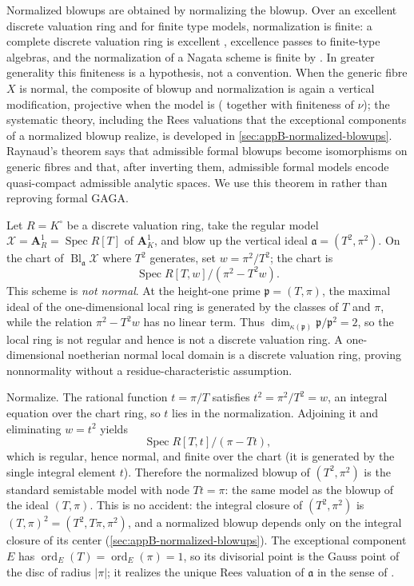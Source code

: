 Normalized blowups are obtained by normalizing the blowup.
Over an excellent
discrete valuation ring and for finite type models, normalization is finite:
a complete discrete valuation ring is excellent
\cite[Scholie~7.8.3]{EGAIV2}, excellence passes to finite-type algebras, and
the normalization of a Nagata scheme is finite by
\cite[Tag 035S]{stacks-project}.
In greater generality this finiteness is a hypothesis, not a convention.
When the generic fibre $X$ is normal, the composite of blowup and
normalization is again a vertical modification,
projective when the model is
( together with finiteness of
$\nu$); the systematic theory, including the Rees valuations that the
exceptional components of a normalized blowup realize, is developed in
\cref{sec:appB-normalized-blowups}.
Raynaud's theorem says that admissible formal blowups become isomorphisms on
generic fibres and that, after inverting them, admissible formal models encode
quasi-compact admissible analytic spaces. We use this theorem in
 rather than reproving formal GAGA.

\begin{example}
\label{ex:normalized-blowup-computed}
Let $R=K^\circ$ be a discrete valuation ring, take the regular model
$\mathcal X=\mathbf A^1_R=\operatorname{Spec}R[T]$ of $\mathbf A^1_K$, and
blow up the vertical ideal $\mathfrak a=(T^2,\pi^2)$.  On the chart of
$\operatorname{Bl}_{\mathfrak a}\mathcal X$ where $T^2$ generates, set
$w=\pi^2/T^2$; the chart is
\[
    \operatorname{Spec}R[T,w]/(\pi^2-T^2w).
\]
This scheme is \emph{not normal}.  At the height-one prime
$\mathfrak p=(T,\pi)$, the maximal ideal of the one-dimensional local ring
is generated by the classes of $T$ and $\pi$, while the relation
$\pi^2-T^2w$ has no linear term.  Thus
$\dim_{\kappa(\mathfrak p)}\mathfrak p/\mathfrak p^2=2$, so the local ring
is not regular and hence is not a discrete valuation ring.  A
one-dimensional noetherian normal local domain is a discrete valuation
ring, proving nonnormality without a residue-characteristic assumption.

Normalize.  The rational function $t=\pi/T$ satisfies
$t^2=\pi^2/T^2=w$, an integral equation over the chart ring, so $t$ lies
in the normalization.  Adjoining it and eliminating $w=t^2$ yields
\[
      \operatorname{Spec}R[T,t]/(\pi-Tt),
\]
which is regular, hence normal, and finite over the chart (it is generated
by the single integral element $t$).  Therefore the normalized blowup of
$(T^2,\pi^2)$ is the standard semistable model with node $Tt=\pi$: the
same model as the blowup of the ideal $(T,\pi)$.  This is no accident: the
integral closure of $(T^2,\pi^2)$ is $(T,\pi)^2=(T^2,T\pi,\pi^2)$, and a
normalized blowup depends only on the integral closure of its center
(\cref{sec:appB-normalized-blowups}).  The exceptional component $E$ has
$\operatorname{ord}_E(T)=\operatorname{ord}_E(\pi)=1$, so its divisorial
point is the Gauss point of the disc of radius $|\pi|$; it realizes the
unique Rees valuation of $\mathfrak a$ in the sense of
.
\end{example}

